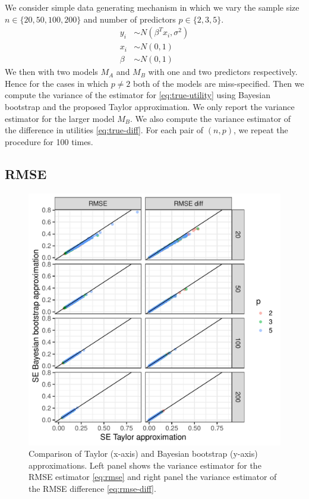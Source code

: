 \documentclass{article}
\begin{document}
We consider simple data generating  mechanism in which we vary the sample size $n \in \{20, 50, 100, 200 \}$ and number of predictors $p \in \{ 2, 3, 5 \}$.
\begin{equation*}
    \begin{aligned}
    y_i &\sim N(\beta^T x_i, \sigma^2) \\
    x_i &\sim N(0, 1) \\
    \beta &\sim N(0, 1)
    \end{aligned}
\end{equation*}
We then with two models $M_A$ and $M_B$ with one and two predictors respectively. Hence for the cases in which $p \neq 2$ both of the models are miss-specified. Then we compute the variance of the estimator for \eqref{eq:true-utility} using Bayesian bootstrap and the proposed Taylor approximation. We only report the variance estimator for the larger model $M_B$. We also compute the variance estimator of the difference in utilities \eqref{eq:true-diff}. For each pair of $(n, p)$, we repeat the procedure for 100 times.

\subsection{RMSE}
\begin{figure}[!htb]
    \centering
    \includegraphics[width=\textwidth]{figures/rmse.pdf}
    \caption{Comparison of Taylor (x-axis) and Bayesian bootstrap (y-axis) approximations. Left panel shows the variance estimator for the RMSE estimator \eqref{eq:rmse} and right panel the variance estimator of the RMSE difference \eqref{eq:rmse-diff}.}
    \label{fig:rmse-plot}
\end{figure}
\end{document}
